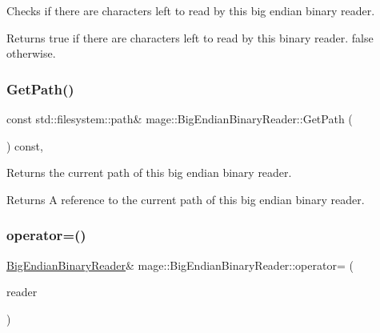 Checks if there are characters left to read by this big endian binary reader.

\begin{DoxyReturn}{Returns}
{\ttfamily true} if there are characters left to read by this binary reader. {\ttfamily false} otherwise. 
\end{DoxyReturn}
\mbox{\label{classmage_1_1_big_endian_binary_reader_a1d21e0117af4cbf99152e4a659372364}} 
\subsubsection{\texorpdfstring{Get\+Path()}{GetPath()}}
{\footnotesize\ttfamily const std\+::filesystem\+::path\& mage\+::\+Big\+Endian\+Binary\+Reader\+::\+Get\+Path (\begin{DoxyParamCaption}{ }\end{DoxyParamCaption}) const\hspace{0.3cm}{\ttfamily [protected]}, {\ttfamily [noexcept]}}

Returns the current path of this big endian binary reader.

\begin{DoxyReturn}{Returns}
A reference to the current path of this big endian binary reader. 
\end{DoxyReturn}
\mbox{\label{classmage_1_1_big_endian_binary_reader_abd4b24df4219469a8c2e9253b1cad405}} 
\subsubsection{\texorpdfstring{operator=()}{operator=()}\hspace{0.1cm}{\footnotesize\ttfamily [1/2]}}
{\footnotesize\ttfamily \mbox{\hyperlink{classmage_1_1_big_endian_binary_reader}{Big\+Endian\+Binary\+Reader}}\& mage\+::\+Big\+Endian\+Binary\+Reader\+::operator= (\begin{DoxyParamCaption}\item[{const \mbox{\hyperlink{classmage_1_1_big_endian_binary_reader}{Big\+Endian\+Binary\+Reader}} \&}]{reader }\end{DoxyParamCaption})\hspace{0.3cm}{\ttfamily [delete]}}

